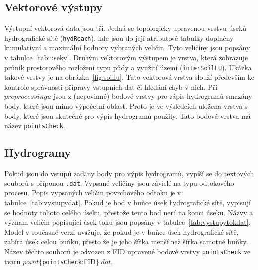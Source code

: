 \subsection{Vektorové výstupy}\label{sec:vektor}

Výstupní vektorová data jsou tři. Jedná se topologicky upravenou vrstvu úseků hydrografické sítě ({\tt hydReach}), kde jsou do její atributové tabulky doplněny kumulativní a maximální hodnoty vybraných veličin. Tyto veličiny jsou popsány v tabulce~\ref{tab:useky}. Druhým vektorovým výstupem je vrstva, která zobrazuje průnik prostorového rozložení typu půdy a využití území ({\tt interSoilLU}). Ukázka takové vrstvy je na obrázku~\ref{fig:soillu}. Tato vektorová vrstva slouží především ke kontrole správnosti přípravy vstupních dat či hledání chyb v nich. Při $preprocessingu$ jsou  z (nepovinné) bodové vrstvy pro zápis hydrogramů smazány body, které jsou mimo výpočetní oblast. Proto je ve výsledcích uložena vrstva s body, které jsou skutečné pro výpis hydrogramů použity. Tato bodová vrstva má název {\tt pointsCheck}. 













\subsection{Hydrogramy}\label{sec:hydrogramy}

Pokud jsou do vstupů zadány body pro výpis hydrogramů, vypíší se do textových souborů s příponou {\tt.dat}. Vypsané veličiny jsou závislé na typu odtokového procesu. Popis vypsaných veličin  povrchového odtoku je v tabulce~\ref{tab:vystupydat}. Pokud je bod v buňce úsek hydrografické sítě, vypisují se hodnoty tohoto celého úseku, přestože tento bod není na konci úseku.  Názvy a význam veličin popisující úsek toku jsou popsány v tabulce~\ref{tab:vystupytokdat}.  Model v současné verzi uvažuje, že pokud je v buňce úsek hydrografické sítě, zabírá úsek celou buňku, přesto že je jeho šířka menší než šířka samotné buňky.  Název těchto souborů je odvozen z FID upravené bodové vrstvy {\tt pointsCheck} ve tvaru $point$\{{\tt pointsCheck}:FID\}$.dat$. 









